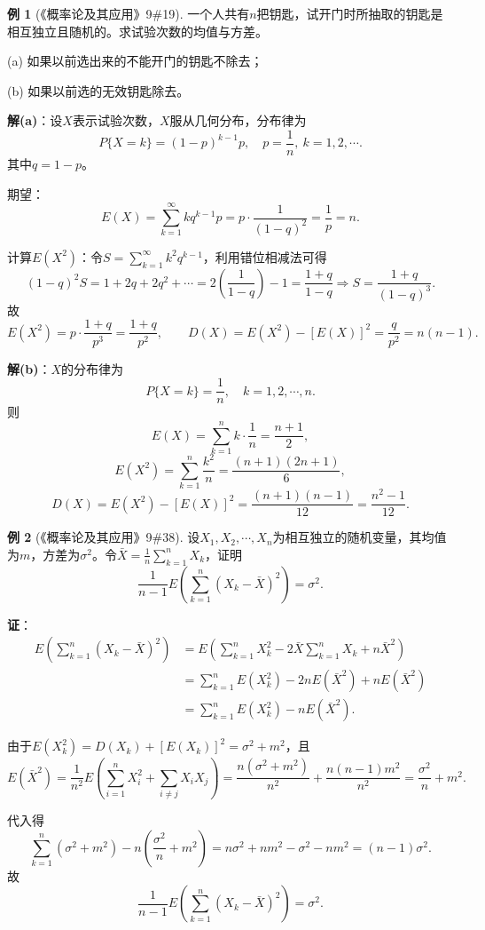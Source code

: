 \documentclass[11pt,a4paper]{report}
\theoremstyle{definition}
\newtheorem{example}{例}[chapter]
\theoremstyle{plain}
\begin{document}
\begin{example}[《概率论及其应用》9\#19]
一个人共有$n$把钥匙，试开门时所抽取的钥匙是相互独立且随机的。求试验次数的均值与方差。

(a) 如果以前选出来的不能开门的钥匙不除去；

(b) 如果以前选的无效钥匙除去。

\textbf{解(a)}：设$X$表示试验次数，$X$服从几何分布，分布律为
\[
P\{X=k\}=(1-p)^{k-1}p,\quad p=\frac{1}{n},\ k=1,2,\cdots.
\]
其中$q=1-p$。

期望：
\[
E(X)=\sum_{k=1}^{\infty}k q^{k-1}p=p\cdot\frac{1}{(1-q)^2}=\frac{1}{p}=n.
\]

计算$E(X^2)$：令$S=\sum_{k=1}^{\infty}k^2 q^{k-1}$，利用错位相减法可得
\[
(1-q)^2 S=1+2q+2q^2+\cdots=2\left(\frac{1}{1-q}\right)-1=\frac{1+q}{1-q}
\Rightarrow S=\frac{1+q}{(1-q)^3}.
\]
故
\[
E(X^2)=p\cdot\frac{1+q}{p^3}=\frac{1+q}{p^2},
\qquad
D(X)=E(X^2)-[E(X)]^2=\frac{q}{p^2}=n(n-1).
\]

\textbf{解(b)}：$X$的分布律为
\[
P\{X=k\}=\frac{1}{n},\quad k=1,2,\cdots,n.
\]
则
\[
E(X)=\sum_{k=1}^{n}k\cdot\frac{1}{n}=\frac{n+1}{2},
\]
\[
E(X^2)=\sum_{k=1}^{n}\frac{k^2}{n}=\frac{(n+1)(2n+1)}{6},
\]
\[
D(X)=E(X^2)-[E(X)]^2=\frac{(n+1)(n-1)}{12}=\frac{n^2-1}{12}.
\]
\end{example}

\begin{example}[《概率论及其应用》9\#38]
设$X_1,X_2,\cdots,X_n$为相互独立的随机变量，其均值为$m$，方差为$\sigma^2$。令$\bar{X}=\frac{1}{n}\sum_{k=1}^{n}X_k$，证明
\[
\frac{1}{n-1}E\left(\sum_{k=1}^{n}(X_k-\bar{X})^2\right)=\sigma^2.
\]

\textbf{证}：
\[
\begin{aligned}
E\left(\sum_{k=1}^{n}(X_k-\bar{X})^2\right)
&=E\left(\sum_{k=1}^{n}X_k^2-2\bar{X}\sum_{k=1}^{n}X_k+n\bar{X}^2\right)\\
&=\sum_{k=1}^{n}E(X_k^2)-2nE(\bar{X}^2)+nE(\bar{X}^2)\\
&=\sum_{k=1}^{n}E(X_k^2)-nE(\bar{X}^2).
\end{aligned}
\]

由于$E(X_k^2)=D(X_k)+[E(X_k)]^2=\sigma^2+m^2$，且
\[
E(\bar{X}^2)=\frac{1}{n^2}E\left(\sum_{i=1}^{n}X_i^2+\sum_{i\neq j}X_i X_j\right)
=\frac{n(\sigma^2+m^2)}{n^2}+\frac{n(n-1)m^2}{n^2}
=\frac{\sigma^2}{n}+m^2.
\]

代入得
\[
\sum_{k=1}^{n}(\sigma^2+m^2)-n\left(\frac{\sigma^2}{n}+m^2\right)
=n\sigma^2+nm^2-\sigma^2-nm^2
=(n-1)\sigma^2.
\]
故
\[
\frac{1}{n-1}E\left(\sum_{k=1}^{n}(X_k-\bar{X})^2\right)=\sigma^2.
\]
\end{example}
\end{document}

